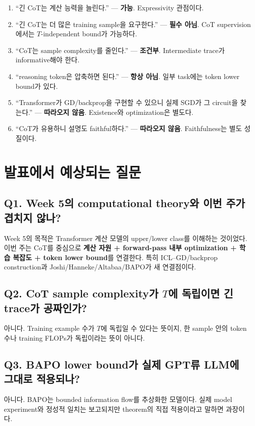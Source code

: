 \documentclass[11pt,a4paper,oneside,openany]{memoir}
\theoremstyle{definition}
\begin{document}
\begin{enumerate}
\item ``긴 CoT는 계산 능력을 늘린다.'' --- \textbf{가능}. Expressivity 관점이다.
\item ``긴 CoT는 더 많은 training sample을 요구한다.'' --- \textbf{필수 아님}. CoT supervision에서는 $T$-independent bound가 가능하다.
\item ``CoT는 sample complexity를 줄인다.'' --- \textbf{조건부}. Intermediate trace가 informative해야 한다.
\item ``reasoning token은 압축하면 된다.'' --- \textbf{항상 아님}. 일부 task에는 token lower bound가 있다.
\item ``Transformer가 GD/backprop을 구현할 수 있으니 실제 SGD가 그 circuit을 찾는다.'' --- \textbf{따라오지 않음}. Existence와 optimization은 별도다.
\item ``CoT가 유용하니 설명도 faithful하다.'' --- \textbf{따라오지 않음}. Faithfulness는 별도 성질이다.
\end{enumerate}

\section{발표에서 예상되는 질문}

\subsection*{Q1. Week 5의 computational theory와 이번 주가 겹치지 않나?}
Week 5의 목적은 Transformer 계산 모델의 upper/lower class를 이해하는 것이었다.
이번 주는 CoT를 중심으로 \textbf{계산 자원 + forward-pass 내부 optimization + 학습 복잡도 + token lower bound}를 연결한다. 특히 ICL--GD/backprop construction과 Joshi/Hanneke/Altabaa/BAPO가 새 연결점이다.

\subsection*{Q2. CoT sample complexity가 $T$에 독립이면 긴 trace가 공짜인가?}
아니다. Training example 수가 $T$에 독립일 수 있다는 뜻이지, 한 sample 안의 token 수나 training FLOPs가 독립이라는 뜻이 아니다.

\subsection*{Q3. BAPO lower bound가 실제 GPT류 LLM에 그대로 적용되나?}
아니다. BAPO는 bounded information flow를 추상화한 모델이다.
실제 model experiment와 정성적 일치는 보고되지만 theorem의 직접 적용이라고 말하면 과장이다.
\end{document}
